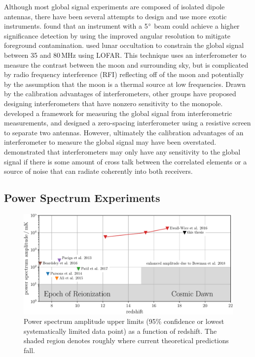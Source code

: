 \begin{bibunit}
Although most global signal experiments are composed of isolated dipole antennas, there have been
several attempts to design and use more exotic instruments. \citet{2013PhRvD..87d3002L} found that
an instrument with a 5$\mbox{$^\circ$}$ beam could achieve a higher significance detection by using the
improved angular resolution to mitigate foreground contamination. \citet{2015MNRAS.450.2291V} used
lunar occultation to constrain the global signal between 35 and 80\,MHz using LOFAR. This technique
uses an interferometer to measure the contrast between the moon and surrounding sky, but is
complicated by radio frequency interference (RFI) reflecting off of the moon and potentially by the
assumption that the moon is a thermal source at low frequencies. Drawn by the calibration advantages
of interferometers, other groups have proposed designing interferometers that have nonzero
sensitivity to the monopole. \citet{2015ApJ...809...18P} developed a framework for measuring the
global signal from interferometric measurements, and \citet{2015ApJ...815...88S} designed a
zero-spacing interferometer using a resistive screen to separate two antennas. However, ultimately
the calibration advantages of an interferometer to measure the global signal may have been
overstated.  \citet{2016ApJ...826..116V} demonstrated that interferometers may only have any
sensitivity to the global signal if there is some amount of cross talk between the correlated
elements or a source of noise that can radiate coherently into both receivers.

\subsection{Power Spectrum Experiments}

\begin{figure}[t]
    \centering
    \includegraphics[width=\textwidth]{figures/chapter1/power-spectrum-upper-limits/power-spectrum-upper-limits}
    \caption{
        Power spectrum amplitude upper limits (95\% confidence or lowest systematically limited data
        point) as a function of redshift. The shaded region denotes roughly where current
        theoretical predictions fall.
    }
    \label{fig:power-spectrum-upper-limits}
\end{figure}


\end{bibunit}
